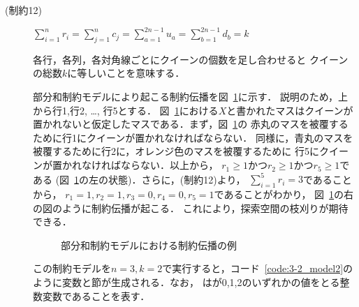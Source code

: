 \begin{description}
 \item[(制約12)] $\sum\limits_{i=1}^{n} 
r_{i} = \sum\limits_{j=1}^{n} 
c_{j} =\sum\limits_{a=1}^{2n-1} 
u_{a} =\sum\limits_{b=1}^{2n-1} 
d_{b} = k$ \par
各行，各列，各対角線ごとにクイーンの個数を足し合わせると
クイーンの総数$k$に等しいことを意味する．\par

部分和制約モデルにより起こる制約伝播を図~\ref{fig:constraint}に示す．
説明のため，上から行1,行2, \dots , 行5とする．
図~\ref{fig:constraint}における$X$と書かれたマスはクイーンが
置かれないと仮定したマスである．まず，図~\ref{fig:constraint}の
赤丸のマスを被覆するために行1にクイーンが置かれなければならない．
同様に，青丸のマスを被覆するために行2に，オレンジ色のマスを被覆するために
行5にクイーンが置かれなければならない．以上から，
$r_1 \geq 1$かつ$r_2 \geq 1$かつ$r_5 \geq 1$である
(図~\ref{fig:constraint}の左の状態)．さらに，(制約12)より，
$\sum\limits _{i=1}^{5} r_i = 3$であることから，
$r_1 = 1,r_2=1,r_3=0,r_4=0,r_5=1$であることがわかり，
図~\ref{fig:constraint}の右の図のように制約伝播が起こる．
これにより，探索空間の枝刈りが期待できる．

\begin{figure}[htb]
 \begin{minipage}[b]{0.45\linewidth}
  \centering
  
 \end{minipage}
 \begin{minipage}[b]{0.45\linewidth}
  
 \end{minipage}
 \caption{部分和制約モデルにおける制約伝播の例}
 \label{fig:constraint}
\end{figure}

この制約モデルを$n=3,k=2$で実行すると，コード~\ref{code:3-2_model2}のように変数と節が生成される．なお，  はが0,1,2のいずれかの値をとる整数変数であることを表す．


\end{description}